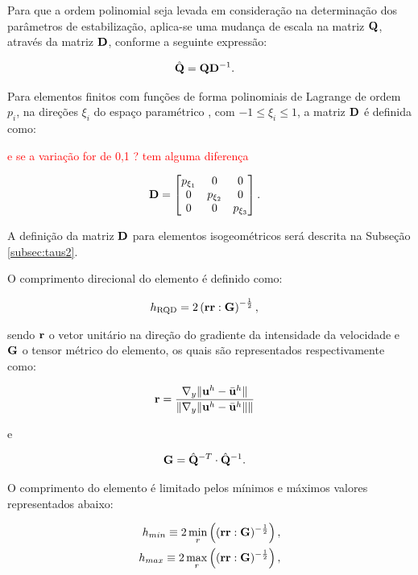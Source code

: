 \documentclass[tese_patricia]{subfiles}%
\begin{document}
Para que a ordem polinomial seja levada em consideração na determinação dos parâmetros de estabilização, aplica-se uma mudança de escala na matriz $\mathbf{Q}$, através da matriz $\mathbf{D}$, conforme a seguinte expressão:

\begin{align}
	\hat{\mathbf{Q}}&=\mathbf{Q}\mathbf{D}^{-1}.
\end{align}

Para elementos finitos com funções de forma polinomiais de Lagrange de ordem $p_{i}$, na direções $\xi_i$ do espaço paramétrico , com $-1\leq\xi_i\leq1$, a  matriz $\mathbf{D}$ é definida como:


\textcolor{red}{e se a variação for de 0,1 ? tem alguma diferença}

\begin{align}
	\mathbf{D}&=\begin{bmatrix}
		p_{\xi_1} & 0 & 0\\
		0 & p_{\xi_2} & 0 \\
		0 & 0 & p_{\xi_3}
	\end{bmatrix}.
\end{align}

A definição da matriz $\mathbf{D}$ para elementos isogeométricos será descrita na Subseção \ref{subsec:taus2}.

O comprimento direcional do elemento é definido como:

\begin{align}
	h_{\mathrm{RQD}} &=2\left(\mathbf{r}\mathbf{r} : \mathbf{G} \right)^{-\frac{1}{2}},
\end{align}

\noindent sendo $\mathbf{r}$ o vetor unitário na direção do gradiente da intensidade da velocidade e $\mathbf{G}$ o tensor métrico do elemento, os quais são representados respectivamente como:

\begin{align}
	\mathbf{r}&=\frac{\nabla_y \lVert\mathbf{u}^h - \bar{\mathbf{u}}^h\rVert}{\lVert \nabla_y \lVert\mathbf{u}^h - \bar{\mathbf{u}}^h\rVert\rVert} \label{eq:erRGN}
\end{align}

\noindent e

\begin{align}
	\mathbf{G} &= \hat{\mathbf{Q}}^{-T} \cdot \hat{\mathbf{Q}}^{-1}. 
\end{align}

O comprimento do elemento é limitado pelos mínimos e máximos valores representados abaixo:

\begin{align}
	h_{min} \equiv 2\min_{r}\left((\mathbf{r}\mathbf{r}:\mathbf{G})^{-\frac{1}{2}} \right), \\
	h_{max} \equiv 2\max_{r}\left((\mathbf{r}\mathbf{r}:\mathbf{G})^{-\frac{1}{2}} \right),
\end{align}
\end{document}
